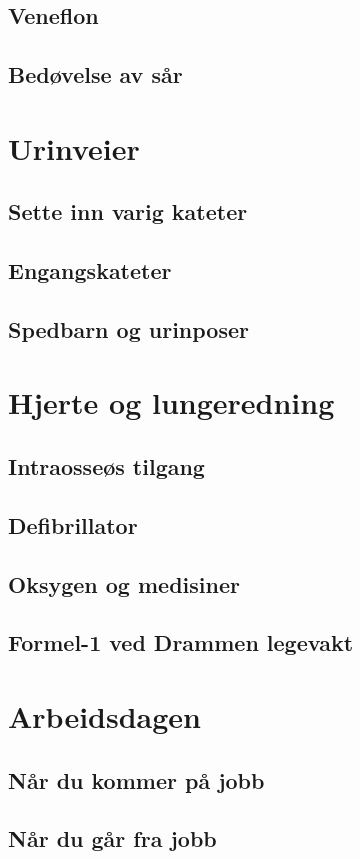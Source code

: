 \documentclass[a4paper,12pt,twoside]{memoir}
\begin{document}
			\section{Veneflon}
			\section{Bedøvelse av sår}
		\chapter{Urinveier}
			\section{Sette inn varig kateter}
			\section{Engangskateter}
			\section{Spedbarn og urinposer}
		\chapter{Hjerte og lungeredning}
			\section{Intraosseøs tilgang}
			\section{Defibrillator}
			\section{Oksygen og medisiner}
			\section{Formel-1 ved Drammen legevakt}
		\chapter{Arbeidsdagen}
			\section{Når du kommer på jobb}
			\section{Når du går fra jobb}
		
\end{document}
